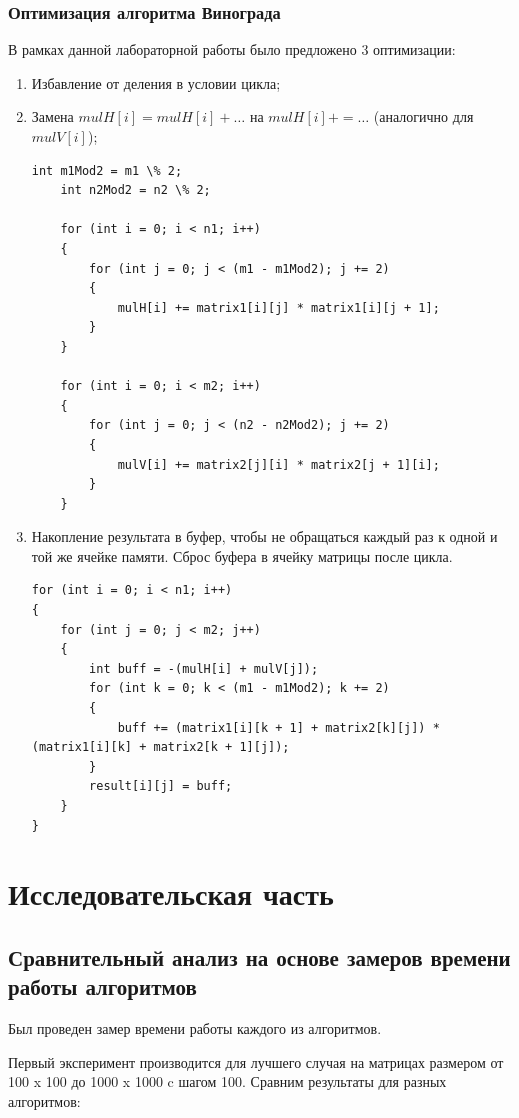 \documentclass[12pt]{report}
\begin{document}
\subsection{Оптимизация алгоритма Винограда}
В рамках данной лабораторной работы было предложено 3 оптимизации:
\begin{enumerate}
	\item Избавление от деления в условии цикла;
	\item Замена $mulH[i] = mulH[i] + …$ на $mulH[i] += …$ (аналогично для $mulV[i]$);
	
\newpage
	\begin{lstlisting}[label=some-code,caption=Оптимизации алгоритма Винограда №1 и №2]
	int m1Mod2 = m1 \% 2;
	int n2Mod2 = n2 \% 2;

	for (int i = 0; i < n1; i++)
	{
		for (int j = 0; j < (m1 - m1Mod2); j += 2)
		{
			mulH[i] += matrix1[i][j] * matrix1[i][j + 1];
		}
	}

	for (int i = 0; i < m2; i++)
	{
		for (int j = 0; j < (n2 - n2Mod2); j += 2)
		{
			mulV[i] += matrix2[j][i] * matrix2[j + 1][i];
		}
	}
	\end{lstlisting}

	\item Накопление результата в буфер, чтобы не обращаться каждый раз к одной и той же ячейке памяти. Сброс буфера в ячейку матрицы после цикла.
	\begin{lstlisting}[label=some-code,caption=Оптимизации алгоритма Винограда №3]
for (int i = 0; i < n1; i++)
{
	for (int j = 0; j < m2; j++)
	{
		int buff = -(mulH[i] + mulV[j]);
		for (int k = 0; k < (m1 - m1Mod2); k += 2)
		{
			buff += (matrix1[i][k + 1] + matrix2[k][j]) * (matrix1[i][k] + matrix2[k + 1][j]);
		}
		result[i][j] = buff;
	}
}
\end{lstlisting}
\end{enumerate}



\chapter{Исследовательская часть}

\section{Сравнительный анализ на основе замеров времени работы алгоритмов}

Был проведен замер времени работы каждого из алгоритмов.

Первый эксперимент производится для лучшего случая на матрицах размером от 100 x 100 до 1000 x 1000 c шагом 100. 
Сравним результаты для разных алгоритмов:
\end{document}
